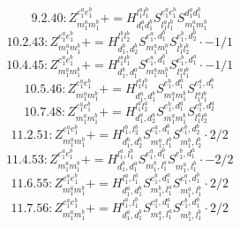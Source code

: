 \documentclass[letterpaper,10pt,fleqn,leqno,onecolumn]{article}
\begin{document}
\begin{equation} \;\;\;\;\;\;  9.2.40: Z^{e_{1}^{a}e_{1}^{b}}_{m_{1}^{a}m_{1}^{b}}+=H^{l_{1}^{a}l_{1}^{b}}_{d_{1}^{a}d_{1}^{b}}S^{e_{1}^{a}e_{1}^{b}}_{l_{1}^{a}l_{1}^{b}}S^{d_{1}^{a}d_{1}^{b}}_{m_{1}^{a}m_{1}^{b}} \end{equation}
\begin{equation} \;\;\;\;\;\;  10.2.43: Z^{e_{1}^{a}e_{1}^{b}}_{m_{1}^{a}m_{1}^{b}}+=H^{l_{1}^{b}l_{2}^{b}}_{d_{1}^{b},d_{2}^{b}}S^{e_{1}^{a},d_{1}^{b}}_{m_{1}^{a}m_{1}^{b}}S^{e_{1}^{b},d_{2}^{b}}_{l_{1}^{b}l_{2}^{b}}\cdot -1/1 \end{equation}
\begin{equation} \;\;\;\;\;\;  10.4.45: Z^{e_{1}^{a}e_{1}^{b}}_{m_{1}^{a}m_{1}^{b}}+=H^{l_{1}^{a}l_{1}^{b}}_{d_{1}^{b},d_{1}^{a}}S^{e_{1}^{a},d_{1}^{b}}_{m_{1}^{a}m_{1}^{b}}S^{e_{1}^{b},d_{1}^{a}}_{l_{1}^{a}l_{1}^{b}}\cdot -1/1 \end{equation}
\begin{equation} \;\;\;\;\;\;  10.5.46: Z^{e_{1}^{a}e_{1}^{b}}_{m_{1}^{a}m_{1}^{b}}+=H^{l_{1}^{a}l_{1}^{b}}_{d_{1}^{a},d_{1}^{b}}S^{e_{1}^{b},d_{1}^{a}}_{m_{1}^{a}m_{1}^{b}}S^{e_{1}^{a},d_{1}^{b}}_{l_{1}^{a}l_{1}^{b}} \end{equation}
\begin{equation} \;\;\;\;\;\;  10.7.48: Z^{e_{1}^{a}e_{1}^{b}}_{m_{1}^{a}m_{1}^{b}}+=H^{l_{1}^{a}l_{2}^{a}}_{d_{1}^{a},d_{2}^{a}}S^{e_{1}^{b},d_{1}^{a}}_{m_{1}^{a}m_{1}^{b}}S^{e_{1}^{a},d_{2}^{a}}_{l_{1}^{a}l_{2}^{a}} \end{equation}
\begin{equation} \;\;\;\;\;\;  11.2.51: Z^{e_{1}^{a}e_{1}^{b}}_{m_{1}^{a}m_{1}^{b}}+=H^{l_{1}^{b},l_{2}^{b}}_{d_{1}^{b},d_{2}^{b}}S^{e_{1}^{a},d_{1}^{b}}_{m_{1}^{a},l_{1}^{b}}S^{e_{1}^{b},d_{2}^{b}}_{m_{1}^{b},l_{2}^{b}}\cdot 2/2 \end{equation}
\begin{equation} \;\;\;\;\;\;  11.4.53: Z^{e_{1}^{a}e_{1}^{b}}_{m_{1}^{a}m_{1}^{b}}+=H^{l_{1}^{a},l_{1}^{b}}_{d_{1}^{b},d_{1}^{a}}S^{e_{1}^{a},d_{1}^{b}}_{m_{1}^{b},l_{1}^{a}}S^{e_{1}^{b},d_{1}^{a}}_{m_{1}^{a},l_{1}^{b}}\cdot -2/2 \end{equation}
\begin{equation} \;\;\;\;\;\;  11.6.55: Z^{e_{1}^{a}e_{1}^{b}}_{m_{1}^{a}m_{1}^{b}}+=H^{l_{1}^{a},l_{1}^{b}}_{d_{1}^{a},d_{1}^{b}}S^{e_{1}^{b},d_{1}^{a}}_{m_{1}^{b},l_{1}^{a}}S^{e_{1}^{a},d_{1}^{b}}_{m_{1}^{a},l_{1}^{b}}\cdot 2/2 \end{equation}
\begin{equation} \;\;\;\;\;\;  11.7.56: Z^{e_{1}^{a}e_{1}^{b}}_{m_{1}^{a}m_{1}^{b}}+=H^{l_{1}^{a},l_{1}^{b}}_{d_{1}^{a},d_{1}^{b}}S^{e_{1}^{a},d_{1}^{a}}_{m_{1}^{a},l_{1}^{a}}S^{e_{1}^{b},d_{1}^{b}}_{m_{1}^{b},l_{1}^{b}}\cdot 2/2 \end{equation}
\end{document}
